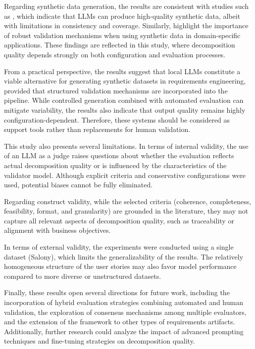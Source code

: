 \documentclass[pdflatex,sn-mathphys-num]{sn-jnl}%
\theoremstyle{thmstyleone}%
\theoremstyle{thmstyletwo}%
\theoremstyle{thmstylethree}%
\begin{document}
Regarding synthetic data generation, the results are consistent with studies such as \cite{long2024}, which indicate that LLMs can produce high-quality synthetic data, albeit with limitations in consistency and coverage. Similarly, \cite{ma2025, fsidi2025} highlight the importance of robust validation mechanisms when using synthetic data in domain-specific applications. These findings are reflected in this study, where decomposition quality depends strongly on both configuration and evaluation processes.

From a practical perspective, the results suggest that local LLMs constitute a viable alternative for generating synthetic datasets in requirements engineering, provided that structured validation mechanisms are incorporated into the pipeline. While controlled generation combined with automated evaluation can mitigate variability, the results also indicate that output quality remains highly configuration-dependent. Therefore, these systems should be considered as support tools rather than replacements for human validation.

This study also presents several limitations. In terms of internal validity, the use of an LLM as a judge raises questions about whether the evaluation reflects actual decomposition quality or is influenced by the characteristics of the validator model. Although explicit criteria and conservative configurations were used, potential biases cannot be fully eliminated.

Regarding construct validity, while the selected criteria (coherence, completeness, feasibility, format, and granularity) are grounded in the literature, they may not capture all relevant aspects of decomposition quality, such as traceability or alignment with business objectives.

In terms of external validity, the experiments were conducted using a single dataset (Salony), which limits the generalizability of the results. The relatively homogeneous structure of the user stories may also favor model performance compared to more diverse or unstructured datasets.

Finally, these results open several directions for future work, including the incorporation of hybrid evaluation strategies combining automated and human validation, the exploration of consensus mechanisms among multiple evaluators, and the extension of the framework to other types of requirements artifacts. Additionally, further research could analyze the impact of advanced prompting techniques and fine-tuning strategies on decomposition quality.
\end{document}
